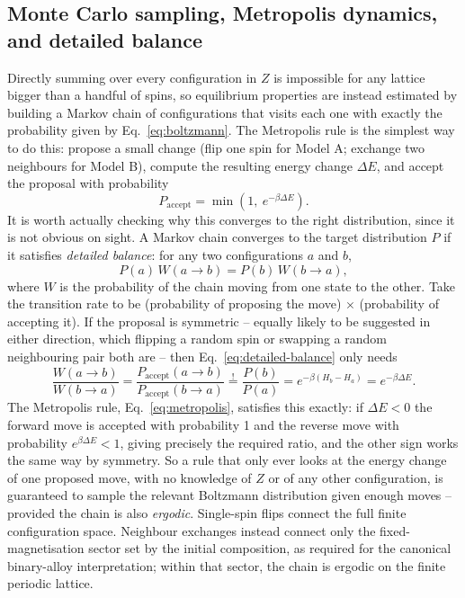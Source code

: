 \documentclass[11pt]{article}
\begin{document}
\subsection{Monte Carlo sampling, Metropolis dynamics, and detailed balance}

Directly summing over every configuration in $Z$ is impossible for any
lattice bigger than a handful of spins, so equilibrium properties are
instead estimated by building a Markov chain of configurations that visits
each one with exactly the probability given by Eq.~\eqref{eq:boltzmann}.
The Metropolis rule \cite{Metropolis1953} is the simplest way to do this:
propose a small change (flip one spin for Model A; exchange two neighbours
for Model B), compute the resulting energy change $\Delta E$, and accept
the proposal with probability
\begin{equation}
P_{\text{accept}} = \min\!\left(1,\ e^{-\beta \Delta E}\right).
\label{eq:metropolis}
\end{equation}
It is worth actually checking why this converges to the right
distribution, since it is not obvious on sight. A Markov chain converges
to the target distribution $P$ if it satisfies \emph{detailed balance}:
for any two configurations $a$ and $b$,
\begin{equation}
P(a)\, W(a \to b) = P(b)\, W(b \to a),
\label{eq:detailed-balance}
\end{equation}
where $W$ is the probability of the chain moving from one state to the
other. Take the transition rate to be (probability of proposing the move)
$\times$ (probability of accepting it). If the proposal is symmetric --
equally likely to be suggested in either direction, which flipping a
random spin or swapping a random neighbouring pair both are -- then
Eq.~\eqref{eq:detailed-balance} only needs
\begin{equation}
\frac{W(a\to b)}{W(b\to a)} = \frac{P_{\text{accept}}(a\to b)}{P_{\text{accept}}(b\to a)} \stackrel{!}{=} \frac{P(b)}{P(a)} = e^{-\beta(H_b - H_a)} = e^{-\beta \Delta E}.
\end{equation}
The Metropolis rule, Eq.~\eqref{eq:metropolis}, satisfies this exactly:
if $\Delta E < 0$ the forward move is accepted with probability 1 and the
reverse move with probability $e^{\beta\Delta E} < 1$, giving precisely the
required ratio, and the other sign works the same way by symmetry. So a
rule that only ever looks at the energy change of one proposed move,
with no knowledge of $Z$ or of any other configuration, is guaranteed to
sample the relevant Boltzmann distribution given enough moves -- provided
the chain is also \emph{ergodic}. Single-spin flips connect the full finite
configuration space. Neighbour exchanges instead connect only the
fixed-magnetisation sector set by the initial composition, as required for
the canonical binary-alloy interpretation; within that sector, the chain is
ergodic on the finite periodic lattice.
\end{document}
